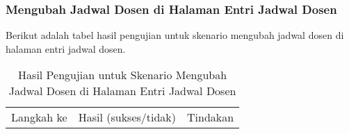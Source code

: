 \subsubsection{Mengubah Jadwal Dosen di Halaman Entri Jadwal Dosen}
\label{subsubsec:hasil_pengujian_mengubah_jadwal_dosen_di_halaman_entri_jadwal_dosen}
Berikut adalah tabel hasil pengujian untuk skenario mengubah jadwal dosen di halaman entri jadwal dosen.

\begin{table}[H]
    \centering 
    \caption{Hasil Pengujian untuk Skenario Mengubah Jadwal Dosen di Halaman Entri Jadwal Dosen}
    \label{tab:hasil_pengujian_mengubah_jadwal_dosen_di_halaman_entri_jadwal_dosen}
    \begin{tabular}{|c|c|p{10cm}|}
        \toprule
        Langkah ke & Hasil (sukses/tidak) & Tindakan \\


\end{tabular}
\end{table}
